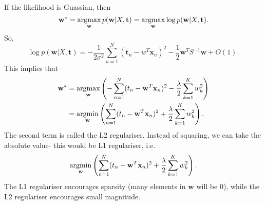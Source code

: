 \documentclass[a4paper, openany]{memoir}
\newcommand{\argmin}{\operatornamewithlimits{argmin}}
\newcommand{\argmax}{\operatornamewithlimits{argmax}}
\begin{document}
    If the likelihood is Guassian, then
    \[\mathbf{w}^* = \argmax_{\mathbf{w}} p(\mathbf{w}|X, \mathbf{t}) = \argmax_{\mathbf{w}} \log p(\mathbf{w}|X, \mathbf{t}).\]
    So,
    \[\log p(\mathbf{w}|X, \mathbf{t}) = -\frac{1}{2\sigma^2} \sum_{n=1}^N (\mathbf{t}_n - w^T \mathbf{x}_n)^2 - \frac{1}{2} \mathbf{w}^T S^{-1} \mathbf{w} + O(1).\]
    This implies that
    \begin{align*}
        \mathbf{w}^* &= \argmax_{\mathbf{w}} \left(-\sum_{n=1}^N (t_n - \mathbf{w}^T \mathbf{x}_n)^2 - \frac{\lambda}{2} \sum_{k=1}^K w_k^2\right) \\
        &= \argmin_{\mathbf{w}} \left(\sum_{n=1}^N (t_n - \mathbf{w}^T \mathbf{x}_n)^2 + \frac{\lambda}{2} \sum_{k=1}^K w_k^2\right).
    \end{align*}
    The second term is called the L2 regulariser. Instead of squaring, we can take the absolute value- this would be L1 regulariser, i.e.
    \[\argmin_{\mathbf{w}} \left(\sum_{n=1}^N (t_n - \mathbf{w}^T \mathbf{x}_n)^2 + \frac{\lambda}{2} \sum_{k=1}^K w_k^2\right).\]
    The L1 regulariser encourages sparsity (many elements in $\mathbf{w}$ will be 0), while the L2 regulariser encourages small magnitude.
\end{document}
